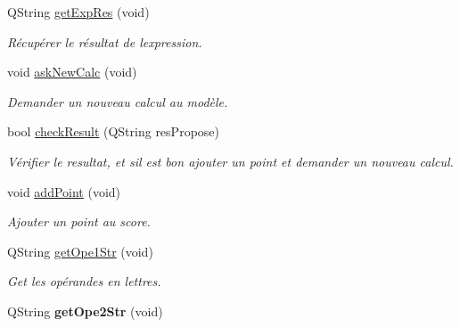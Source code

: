 \begin{DoxyCompactItemize}
\mbox{\label{class_calcul_mental_a559ea88a8156df0f54761c4f0cc17144}} 
Q\+String \hyperlink{class_calcul_mental_a559ea88a8156df0f54761c4f0cc17144}{get\+Exp\+Res} (void)
\begin{DoxyCompactList}\small\item\em Récupérer le résultat de l\textquotesingle{}expression. \end{DoxyCompactList}\item 
\mbox{\label{class_calcul_mental_a1078407e65b60debd469fbdd6b629366}} 
void \hyperlink{class_calcul_mental_a1078407e65b60debd469fbdd6b629366}{ask\+New\+Calc} (void)
\begin{DoxyCompactList}\small\item\em Demander un nouveau calcul au modèle. \end{DoxyCompactList}\item 
\mbox{\label{class_calcul_mental_a85dd050ef2efa7c6440a1ba0595b6c2e}} 
bool \hyperlink{class_calcul_mental_a85dd050ef2efa7c6440a1ba0595b6c2e}{check\+Result} (Q\+String res\+Propose)
\begin{DoxyCompactList}\small\item\em Vérifier le resultat, et s\textquotesingle{}il est bon ajouter un point et demander un nouveau calcul. \end{DoxyCompactList}\item 
\mbox{\label{class_calcul_mental_a24f15b92a313ab8ca872b0d495ce4852}} 
void \hyperlink{class_calcul_mental_a24f15b92a313ab8ca872b0d495ce4852}{add\+Point} (void)
\begin{DoxyCompactList}\small\item\em Ajouter un point au score. \end{DoxyCompactList}\item 
\mbox{\label{class_calcul_mental_ac56dfddc93f21f48beb2202940d7d005}} 
Q\+String \hyperlink{class_calcul_mental_ac56dfddc93f21f48beb2202940d7d005}{get\+Ope1\+Str} (void)
\begin{DoxyCompactList}\small\item\em Get les opérandes en lettres. \end{DoxyCompactList}\item 
\mbox{\label{class_calcul_mental_afd4f24b373c7ba4fe2fa247819266096}} 
Q\+String {\bfseries get\+Ope2\+Str} (void)
\end{DoxyCompactItemize}


